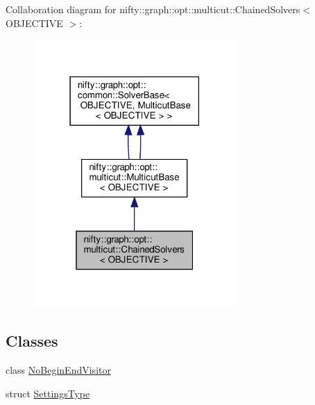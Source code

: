 Collaboration diagram for nifty\+:\+:graph\+:\+:opt\+:\+:multicut\+:\+:Chained\+Solvers$<$ O\+B\+J\+E\+C\+T\+I\+VE $>$\+:
\nopagebreak
\begin{figure}[H]
\begin{center}
\leavevmode
\includegraphics[width=219pt]{classnifty_1_1graph_1_1opt_1_1multicut_1_1ChainedSolvers__coll__graph}
\end{center}
\end{figure}
\subsection*{Classes}
\begin{DoxyCompactItemize}
\item 
class \hyperlink{classnifty_1_1graph_1_1opt_1_1multicut_1_1ChainedSolvers_1_1NoBeginEndVisitor}{No\+Begin\+End\+Visitor}
\item 
struct \hyperlink{structnifty_1_1graph_1_1opt_1_1multicut_1_1ChainedSolvers_1_1SettingsType}{Settings\+Type}
\end{DoxyCompactItemize}
